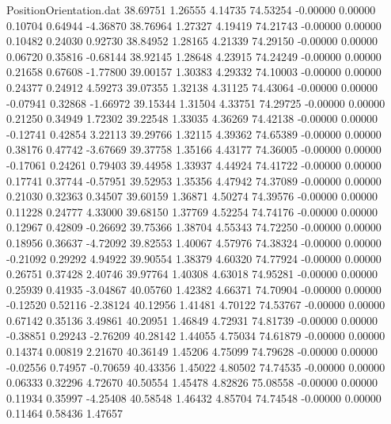 \begin{filecontents}{PositionOrientation.dat}
  38.69751    1.26555    4.14735    74.53254   -0.00000    0.00000    0.10704    0.64944   -4.36870
  38.76964    1.27327    4.19419    74.21743   -0.00000    0.00000    0.10482    0.24030    0.92730
  38.84952    1.28165    4.21339    74.29150   -0.00000    0.00000    0.06720    0.35816   -0.68144
  38.92145    1.28648    4.23915    74.24249   -0.00000    0.00000    0.21658    0.67608   -1.77800
  39.00157    1.30383    4.29332    74.10003   -0.00000    0.00000    0.24377    0.24912    4.59273
  39.07355    1.32138    4.31125    74.43064   -0.00000    0.00000   -0.07941    0.32868   -1.66972
  39.15344    1.31504    4.33751    74.29725   -0.00000    0.00000    0.21250    0.34949    1.72302
  39.22548    1.33035    4.36269    74.42138   -0.00000    0.00000   -0.12741    0.42854    3.22113
  39.29766    1.32115    4.39362    74.65389   -0.00000    0.00000    0.38176    0.47742   -3.67669
  39.37758    1.35166    4.43177    74.36005   -0.00000    0.00000   -0.17061    0.24261    0.79403
  39.44958    1.33937    4.44924    74.41722   -0.00000    0.00000    0.17741    0.37744   -0.57951
  39.52953    1.35356    4.47942    74.37089   -0.00000    0.00000    0.21030    0.32363    0.34507
  39.60159    1.36871    4.50274    74.39576   -0.00000    0.00000    0.11228    0.24777    4.33000
  39.68150    1.37769    4.52254    74.74176   -0.00000    0.00000    0.12967    0.42809   -0.26692
  39.75366    1.38704    4.55343    74.72250   -0.00000    0.00000    0.18956    0.36637   -4.72092
  39.82553    1.40067    4.57976    74.38324   -0.00000    0.00000   -0.21092    0.29292    4.94922
  39.90554    1.38379    4.60320    74.77924   -0.00000    0.00000    0.26751    0.37428    2.40746
  39.97764    1.40308    4.63018    74.95281   -0.00000    0.00000    0.25939    0.41935   -3.04867
  40.05760    1.42382    4.66371    74.70904   -0.00000    0.00000   -0.12520    0.52116   -2.38124
  40.12956    1.41481    4.70122    74.53767   -0.00000    0.00000    0.67142    0.35136    3.49861
  40.20951    1.46849    4.72931    74.81739   -0.00000    0.00000   -0.38851    0.29243   -2.76209
  40.28142    1.44055    4.75034    74.61879   -0.00000    0.00000    0.14374    0.00819    2.21670
  40.36149    1.45206    4.75099    74.79628   -0.00000    0.00000   -0.02556    0.74957   -0.70659
  40.43356    1.45022    4.80502    74.74535   -0.00000    0.00000    0.06333    0.32296    4.72670
  40.50554    1.45478    4.82826    75.08558   -0.00000    0.00000    0.11934    0.35997   -4.25408
  40.58548    1.46432    4.85704    74.74548   -0.00000    0.00000    0.11464    0.58436    1.47657

\end{filecontents}
